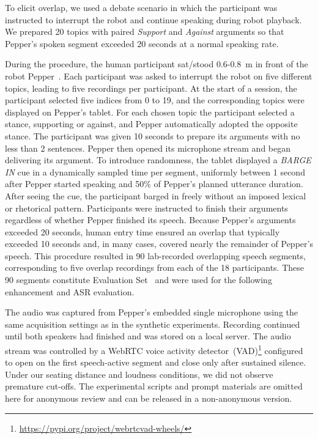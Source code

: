 \documentclass[manuscript,screen,review]{acmart}
\newcommand{\RomanNumeralCaps}[1]
    {\MakeUppercase{\romannumeral #1}}
\begin{document}
To elicit overlap, we used a debate scenario in which the participant was instructed to interrupt the robot and continue speaking during robot playback. We prepared 20 topics with paired \textit{Support} and \textit{Against} arguments so that Pepper's spoken segment exceeded 20 seconds at a normal speaking rate.

During the procedure, the human participant sat/stood 0.6-0.8~m in front of the robot Pepper~\cite{weisser2021conversational}. Each participant was asked to interrupt the robot on five different topics, leading to five recordings per participant. At the start of a session, the participant selected five indices from 0 to 19, and the corresponding topics were displayed on Pepper’s tablet. For each chosen topic the participant selected a stance, supporting or against, and Pepper automatically adopted the opposite stance. The participant was given 10 seconds to prepare its arguments with no less than 2 sentences. Pepper then opened its microphone stream and began delivering its argument. To introduce randomness, the tablet displayed a \textit{BARGE IN} cue in a dynamically sampled time per segment, uniformly between 1 second after Pepper started speaking and 50\% of Pepper’s planned utterance duration. After seeing the cue, the participant barged in freely without an imposed lexical or rhetorical pattern. Participants were instructed to finish their arguments regardless of whether Pepper finished its speech. Because Pepper’s arguments exceeded 20 seconds, human entry time ensured an overlap that typically exceeded 10 seconds and, in many cases, covered nearly the remainder of Pepper's speech. 
This procedure resulted in 90 lab-recorded overlapping speech segments, corresponding to five overlap recordings from each of the 18 participants. These 90 segments constitute Evaluation Set~\RomanNumeralCaps{3} and were used for the following enhancement and ASR evaluation.

The audio was captured from Pepper's embedded single microphone using the same acquisition settings as in the synthetic experiments. Recording continued until both speakers had finished and was stored on a local server. The audio stream was controlled by a WebRTC voice activity detector~(VAD)\footnote{\url{https://pypi.org/project/webrtcvad-wheels/}} configured to open on the first speech-active segment and close only after sustained silence. Under our seating distance and loudness conditions, we did not observe premature cut-offs. The experimental scripts and prompt materials are omitted here for anonymous review and can be released in a non-anonymous version.
\end{document}
